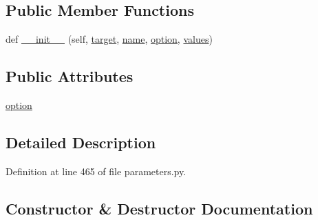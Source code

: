 \subsection*{Public Member Functions}
\begin{DoxyCompactItemize}
\item 
def \hyperlink{classcodar_1_1cheetah_1_1parameters_1_1_param_env_var_a7f0389cec4b151e86fc41fc1548657bd}{\+\_\+\+\_\+init\+\_\+\+\_\+} (self, \hyperlink{classcodar_1_1cheetah_1_1parameters_1_1_param_a5603d43a20cfc6447c3718406ce0669e}{target}, \hyperlink{classcodar_1_1cheetah_1_1parameters_1_1_param_ac9982d62cd18a368a3fbc26541e14209}{name}, \hyperlink{classcodar_1_1cheetah_1_1parameters_1_1_param_env_var_acb91e037a8f36b24a8588b808ad70444}{option}, \hyperlink{classcodar_1_1cheetah_1_1parameters_1_1_param_aefcc82658f511bddd6605e6ac6e74fbf}{values})
\end{DoxyCompactItemize}
\subsection*{Public Attributes}
\begin{DoxyCompactItemize}
\item 
\hyperlink{classcodar_1_1cheetah_1_1parameters_1_1_param_env_var_acb91e037a8f36b24a8588b808ad70444}{option}
\end{DoxyCompactItemize}


\subsection{Detailed Description}


Definition at line 465 of file parameters.\+py.



\subsection{Constructor \& Destructor Documentation}
\mbox{\label{classcodar_1_1cheetah_1_1parameters_1_1_param_env_var_a7f0389cec4b151e86fc41fc1548657bd}} 

